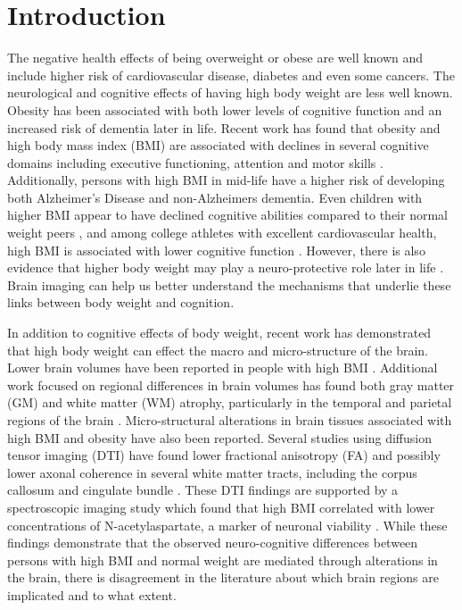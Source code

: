 

\section{Introduction}

	The negative health effects of being overweight or obese are well known and include higher risk of cardiovascular disease, diabetes and even some cancers. The neurological and cognitive effects of having high body weight are less well known. Obesity has been associated with both lower levels of cognitive function and an increased risk of dementia later in life. Recent work has found that obesity and high body mass index (BMI) are associated with declines in several cognitive domains including executive functioning, attention and motor skills \cite{Memel_2016,Yau_2012,Gunstad_2007,Nguyen_2014}. Additionally, persons with high BMI in mid-life have a higher risk of developing both Alzheimer's Disease and non-Alzheimers dementia. Even children with higher BMI appear to have declined cognitive abilities compared to their normal weight peers \cite{Liang_2013}, and among college athletes with excellent cardiovascular health, high BMI is associated with lower cognitive function \cite{Fedor_2013}. However, there is also evidence that higher body weight may play a neuro-protective role later in life \cite{Hsu_2015}. Brain imaging can help us better understand the mechanisms that underlie these links between body weight and cognition.
	
	In addition to cognitive effects of body weight, recent work has demonstrated that high body weight can effect the macro and micro-structure of the brain. Lower brain volumes have been reported in people with high BMI \cite{Ho_2010a,Raji_2009}. Additional work focused on regional differences in brain volumes has found both gray matter (GM) and white matter (WM) atrophy, particularly in the temporal and parietal regions of the brain \cite{Willette_2015}. Micro-structural alterations in brain tissues associated with high BMI and obesity have also been reported. Several studies using diffusion tensor imaging (DTI) have found lower fractional anisotropy (FA) and possibly lower axonal coherence in several white matter tracts, including the corpus callosum and cingulate bundle \cite{Bettcher_2013}. These DTI findings are supported by a spectroscopic imaging study which found that high BMI correlated with lower concentrations of N-acetylaspartate, a marker of neuronal viability \cite{Gazdzinski_2008}. While these findings demonstrate that the observed neuro-cognitive differences between persons with high BMI and normal weight are mediated through alterations in the brain, there is disagreement in the literature about which brain regions are implicated and to what extent.
	
